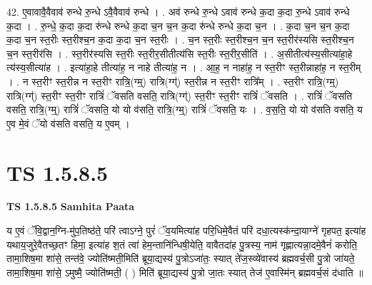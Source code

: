 \documentclass[17pt]{extarticle}
\begin{document}
42. ए॒वावावै॒वैवाव॑ रुन्धे रु॒न्धे ऽवै॒वैवाव॑ रुन्धे । . अव॑ रुन्धे रु॒न्धे ऽवाव॑ रुन्धे क॒दा क॒दा रु॒न्धे ऽवाव॑ रुन्धे क॒दा । . रु॒न्धे॒ क॒दा क॒दा रु॑न्धे रुन्धे क॒दा च॒न च॒न क॒दा रु॑न्धे रुन्धे क॒दा च॒न । . क॒दा च॒न च॒न क॒दा क॒दा च॒न स्त॒रीः स्त॒रीश्च॒न क॒दा क॒दा च॒न स्त॒रीः । . च॒न स्त॒रीः स्त॒रीश्च॒न च॒न स्त॒रीर॑स्यसि स्त॒रीश्च॒न च॒न स्त॒रीर॑सि । . स्त॒रीर॑स्यसि स्त॒रीः स्त॒रीर॒सीतीत्य॑सि स्त॒रीः स्त॒रीर॒सीति॑ । . अ॒सीतीत्य॑स्य॒सीत्या॑हा॒हे त्य॑स्य॒सीत्या॑ह । . इत्या॑हा॒हे तीत्या॑ह॒ न नाहे तीत्या॑ह॒ न । . आ॒ह॒ न नाहा॑ह॒ न स्त॒रीꣳ स्त॒रीन्नाहा॑ह॒ न स्त॒रीम् । . न स्त॒रीꣳ स्त॒रीन्न न स्त॒रीꣳ रात्रि॒(ग्म्॒) रात्रि(ग्ग्॑) स्त॒रीन्न न स्त॒रीꣳ रात्रि᳚म् । . स्त॒रीꣳ रात्रि॒(ग्म्॒) रात्रि(ग्ग्॑) स्त॒रीꣳ स्त॒रीꣳ रात्रिं॑ ॅवसति वसति॒ रात्रि(ग्ग्॑) स्त॒रीꣳ स्त॒रीꣳ रात्रिं॑ ॅवसति । . रात्रिं॑ ॅवसति वसति॒ रात्रि॒(ग्म्॒) रात्रिं॑ ॅवसति॒ यो यो व॑सति॒ रात्रि॒(ग्म्॒) रात्रिं॑ ॅवसति॒ यः । . व॒स॒ति॒ यो यो व॑सति वसति॒ य ए॒व मे॒वं ॅयो व॑सति वसति॒ य ए॒वम् । \newline
\pagebreak
{}

\section{ TS 1.5.8.5 }

\textbf{TS 1.5.8.5 } \newline
\textbf{Samhita Paata} \newline

य ए॒वं ॅवि॒द्वान॒ग्नि-मु॑प॒तिष्ठ॑ते॒ परि॑ त्वाऽग्ने॒ पुरं॑ ॅव॒यमित्या॑ह परि॒धिमे॒वैतं परि॑ दधा॒त्यस्क॑न्दा॒याग्ने॑ गृहपत॒ इत्या॑ह यथाय॒जुरे॒वैतच्छ॒तꣳ हिमा॒ इत्या॑ह श॒तं त्वा॑ हेम॒न्तानि॑न्धिषी॒येति॒ वावैतदा॑ह पु॒त्रस्य॒ नाम॑ गृह्णात्यन्ना॒दमे॒वैनं॑ करोति॒ तामा॒शिष॒मा शा॑से॒ तन्त॑वे॒ ज्योति॑ष्मती॒मिति॑ ब्रूया॒द्यस्य॑ पु॒त्रोऽजा॑तः॒ स्यात् ते॑ज॒स्व्ये॑वास्य॑ ब्रह्मवर्च॒सी पु॒त्रो जा॑यते॒ तामा॒शिष॒मा शा॑से॒ ऽमुष्मै॒ ज्योति॑ष्मती॒ ( ) मिति॑ ब्रूया॒द्यस्य॑ पु॒त्रो जा॒तः स्यात् तेज॑ ए॒वास्मि॑न् ब्रह्मवर्च॒सं द॑धाति ॥ \newline
\end{document}

